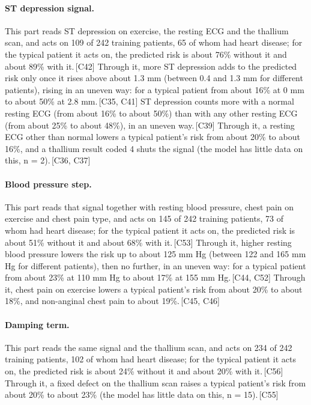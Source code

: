 \documentclass[a4paper,10pt]{article}
\newif\ifreviewmarks
\newcommand{\reviewrule}{\noindent{\color{BrickRed}\rule{\linewidth}{0.8pt}}}
\newenvironment{drafted}[1][]{%
  \ifreviewmarks\par\addvspace{\medskipamount}\reviewrule\par\nopagebreak
  \noindent{\color{BrickRed}\sffamily\footnotesize\textbf{Thesis Draft}\quad #1\hfill review}\par\nopagebreak\smallskip\fi}{%
  \ifreviewmarks\par\smallskip\noindent{\color{BrickRed}\sffamily\footnotesize end of thesis draft}\par\nopagebreak\reviewrule\par\medskip\fi}
\begin{document}
\begin{drafted}[plain-language layer: heart-s5-c2]
\paragraph{ST depression signal.} This part reads ST depression on exercise, the resting ECG and the thallium scan, and acts on 109 of 242 training patients, 65 of whom had heart disease; for the typical patient it acts on, the predicted risk is about 76\% without it and about 89\% with it.\,{\scriptsize\textcolor{NavyBlue}{[C42]}} Through it, more ST depression adds to the predicted risk only once it rises above about 1.3 mm (between 0.4 and 1.3 mm for different patients), rising in an uneven way: for a typical patient from about 16\% at 0 mm to about 50\% at 2.8 mm.\,{\scriptsize\textcolor{NavyBlue}{[C35, C41]}} ST depression counts more with a normal resting ECG (from about 16\% to about 50\%) than with any other resting ECG (from about 25\% to about 48\%), in an uneven way.\,{\scriptsize\textcolor{NavyBlue}{[C39]}} Through it, a resting ECG other than normal lowers a typical patient's risk from about 20\% to about 16\%, and a thallium result coded 4 shuts the signal (the model has little data on this, n = 2).\,{\scriptsize\textcolor{NavyBlue}{[C36, C37]}}
\paragraph{Blood pressure step.} This part reads that signal together with resting blood pressure, chest pain on exercise and chest pain type, and acts on 145 of 242 training patients, 73 of whom had heart disease; for the typical patient it acts on, the predicted risk is about 51\% without it and about 68\% with it.\,{\scriptsize\textcolor{NavyBlue}{[C53]}} Through it, higher resting blood pressure lowers the risk up to about 125 mm Hg (between 122 and 165 mm Hg for different patients), then no further, in an uneven way: for a typical patient from about 23\% at 110 mm Hg to about 17\% at 155 mm Hg.\,{\scriptsize\textcolor{NavyBlue}{[C44, C52]}} Through it, chest pain on exercise lowers a typical patient's risk from about 20\% to about 18\%, and non-anginal chest pain to about 19\%.\,{\scriptsize\textcolor{NavyBlue}{[C45, C46]}}
\paragraph{Damping term.} This part reads the same signal and the thallium scan, and acts on 234 of 242 training patients, 102 of whom had heart disease; for the typical patient it acts on, the predicted risk is about 24\% without it and about 20\% with it.\,{\scriptsize\textcolor{NavyBlue}{[C56]}} Through it, a fixed defect on the thallium scan raises a typical patient's risk from about 20\% to about 23\% (the model has little data on this, n = 15).\,{\scriptsize\textcolor{NavyBlue}{[C55]}}

\end{drafted}
\end{document}
